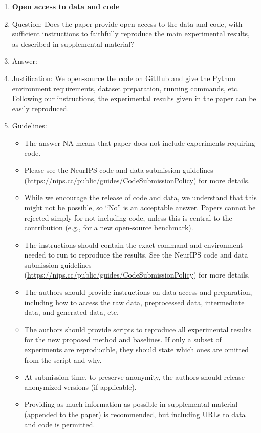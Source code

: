 \documentclass{article}
\begin{document}
\begin{enumerate}
\item {\bf Open access to data and code}
    \item[] Question: Does the paper provide open access to the data and code, with sufficient instructions to faithfully reproduce the main experimental results, as described in supplemental material?
    \item[] Answer: \answerYes{} %
    \item[] Justification: We open-source the code on GitHub and give the Python environment requirements, dataset preparation, running commands, etc. Following our instructions, the experimental results given in the paper can be easily reproduced. 
    \item[] Guidelines:
    \begin{itemize}
        \item The answer NA means that paper does not include experiments requiring code.
        \item Please see the NeurIPS code and data submission guidelines (\url{https://nips.cc/public/guides/CodeSubmissionPolicy}) for more details.
        \item While we encourage the release of code and data, we understand that this might not be possible, so “No” is an acceptable answer. Papers cannot be rejected simply for not including code, unless this is central to the contribution (e.g., for a new open-source benchmark).
        \item The instructions should contain the exact command and environment needed to run to reproduce the results. See the NeurIPS code and data submission guidelines (\url{https://nips.cc/public/guides/CodeSubmissionPolicy}) for more details.
        \item The authors should provide instructions on data access and preparation, including how to access the raw data, preprocessed data, intermediate data, and generated data, etc.
        \item The authors should provide scripts to reproduce all experimental results for the new proposed method and baselines. If only a subset of experiments are reproducible, they should state which ones are omitted from the script and why.
        \item At submission time, to preserve anonymity, the authors should release anonymized versions (if applicable).
        \item Providing as much information as possible in supplemental material (appended to the paper) is recommended, but including URLs to data and code is permitted.
    \end{itemize}



\end{enumerate}
\end{document}
